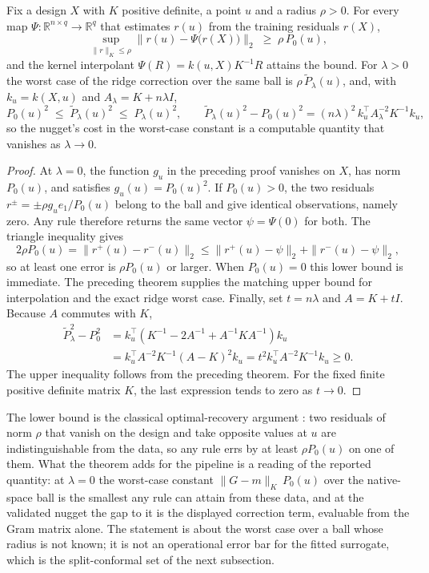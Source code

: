 \begin{theorem}\label{thm:minimax}
Fix a design $X$ with $K$ positive definite, a point $u$ and a radius
$\rho>0$. For every map $\Psi:\mathbb R^{n\times q}\to\mathbb R^q$ that
estimates $r(u)$ from the training residuals $r(X)$,
\[
\sup_{\|r\|_K\le\rho}\big\|r(u)-\Psi\big(r(X)\big)\big\|_2\;\ge\;\rho\,P_0(u),
\]
and the kernel interpolant $\Psi(R)=k(u,X)K^{-1}R$ attains the bound. For
$\lambda>0$ the worst case of the ridge correction over the same ball is
$\rho\,\widetilde P_\lambda(u)$, and, with $k_u=k(X,u)$ and
$A_\lambda=K+n\lambda I$,
\[
P_0(u)^2\;\le\;\widetilde P_\lambda(u)^2\;\le\;P_\lambda(u)^2,\qquad
\widetilde P_\lambda(u)^2-P_0(u)^2=(n\lambda)^2\,k_u^\top
A_\lambda^{-2}K^{-1}k_u ,
\]
so the nugget's cost in the worst-case constant is a computable quantity that
vanishes as $\lambda\to0$.
\end{theorem}
\begin{proof}
At $\lambda=0$, the function $g_u$ in the preceding proof vanishes on $X$,
has norm $P_0(u)$, and satisfies $g_u(u)=P_0(u)^2$. If $P_0(u)>0$, the
two residuals $r^\pm=\pm\rho g_u e_1/P_0(u)$ belong to the ball and give
identical observations, namely zero. Any rule therefore returns the same
vector $\psi=\Psi(0)$ for both. The triangle inequality gives
\[
2\rho P_0(u)=\|r^+(u)-r^-(u)\|_2
\le\|r^+(u)-\psi\|_2+\|r^-(u)-\psi\|_2,
\]
so at least one error is $\rho P_0(u)$ or larger. When $P_0(u)=0$ this
lower bound is immediate. The preceding theorem supplies the matching
upper bound for interpolation and the exact ridge worst case.
Finally, set $t=n\lambda$ and $A=K+tI$. Because $A$ commutes with $K$,
\begin{align*}
\widetilde P_\lambda^2-P_0^2
&=k_u^\top(K^{-1}-2A^{-1}+A^{-1}KA^{-1})k_u\\
&=k_u^\top A^{-2}K^{-1}(A-K)^2k_u
=t^2k_u^\top A^{-2}K^{-1}k_u\ge0.
\end{align*}
The upper inequality follows from the preceding theorem. For the fixed
finite positive definite matrix $K$, the last expression tends to zero
as $t\to0$.
\end{proof}


The lower bound is the classical optimal-recovery argument
\citep{owhadi2019operator}: two residuals of norm $\rho$ that vanish on the
design and take opposite values at $u$ are indistinguishable from the data,
so any rule errs by at least $\rho P_0(u)$ on one of them. What the theorem
adds for the pipeline is a reading of the reported quantity: at $\lambda=0$
the worst-case constant $\|G-m\|_K\,P_0(u)$ over the native-space ball is
the smallest any rule can attain from these data, and at the validated
nugget the gap to it is the displayed correction term, evaluable from the
Gram matrix alone. The statement is about the worst case over a ball whose
radius is not known; it is not an operational error bar for the fitted
surrogate, which is the split-conformal set of the next subsection.

